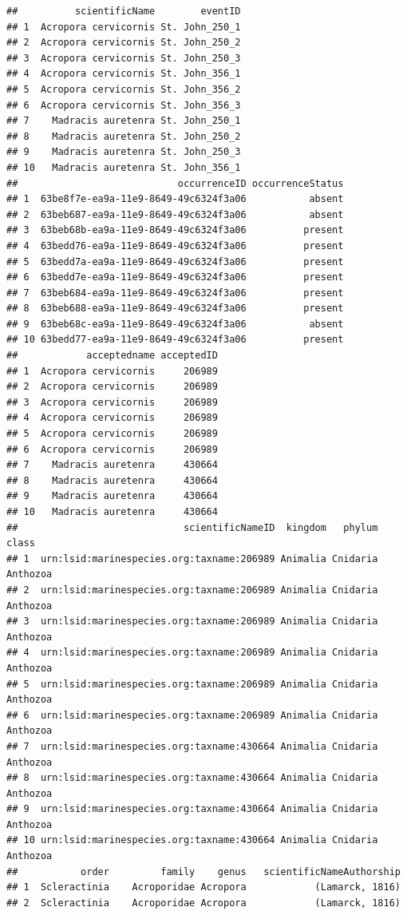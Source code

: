 \documentclass[
]{book}
\begin{document}
\begin{verbatim}
##          scientificName        eventID
## 1  Acropora cervicornis St. John_250_1
## 2  Acropora cervicornis St. John_250_2
## 3  Acropora cervicornis St. John_250_3
## 4  Acropora cervicornis St. John_356_1
## 5  Acropora cervicornis St. John_356_2
## 6  Acropora cervicornis St. John_356_3
## 7    Madracis auretenra St. John_250_1
## 8    Madracis auretenra St. John_250_2
## 9    Madracis auretenra St. John_250_3
## 10   Madracis auretenra St. John_356_1
##                            occurrenceID occurrenceStatus
## 1  63be8f7e-ea9a-11e9-8649-49c6324f3a06           absent
## 2  63beb687-ea9a-11e9-8649-49c6324f3a06           absent
## 3  63beb68b-ea9a-11e9-8649-49c6324f3a06          present
## 4  63bedd76-ea9a-11e9-8649-49c6324f3a06          present
## 5  63bedd7a-ea9a-11e9-8649-49c6324f3a06          present
## 6  63bedd7e-ea9a-11e9-8649-49c6324f3a06          present
## 7  63beb684-ea9a-11e9-8649-49c6324f3a06          present
## 8  63beb688-ea9a-11e9-8649-49c6324f3a06          present
## 9  63beb68c-ea9a-11e9-8649-49c6324f3a06           absent
## 10 63bedd77-ea9a-11e9-8649-49c6324f3a06          present
##            acceptedname acceptedID
## 1  Acropora cervicornis     206989
## 2  Acropora cervicornis     206989
## 3  Acropora cervicornis     206989
## 4  Acropora cervicornis     206989
## 5  Acropora cervicornis     206989
## 6  Acropora cervicornis     206989
## 7    Madracis auretenra     430664
## 8    Madracis auretenra     430664
## 9    Madracis auretenra     430664
## 10   Madracis auretenra     430664
##                             scientificNameID  kingdom   phylum    class
## 1  urn:lsid:marinespecies.org:taxname:206989 Animalia Cnidaria Anthozoa
## 2  urn:lsid:marinespecies.org:taxname:206989 Animalia Cnidaria Anthozoa
## 3  urn:lsid:marinespecies.org:taxname:206989 Animalia Cnidaria Anthozoa
## 4  urn:lsid:marinespecies.org:taxname:206989 Animalia Cnidaria Anthozoa
## 5  urn:lsid:marinespecies.org:taxname:206989 Animalia Cnidaria Anthozoa
## 6  urn:lsid:marinespecies.org:taxname:206989 Animalia Cnidaria Anthozoa
## 7  urn:lsid:marinespecies.org:taxname:430664 Animalia Cnidaria Anthozoa
## 8  urn:lsid:marinespecies.org:taxname:430664 Animalia Cnidaria Anthozoa
## 9  urn:lsid:marinespecies.org:taxname:430664 Animalia Cnidaria Anthozoa
## 10 urn:lsid:marinespecies.org:taxname:430664 Animalia Cnidaria Anthozoa
##           order         family    genus   scientificNameAuthorship
## 1  Scleractinia    Acroporidae Acropora            (Lamarck, 1816)
## 2  Scleractinia    Acroporidae Acropora            (Lamarck, 1816)

\end{verbatim}
\end{document}
